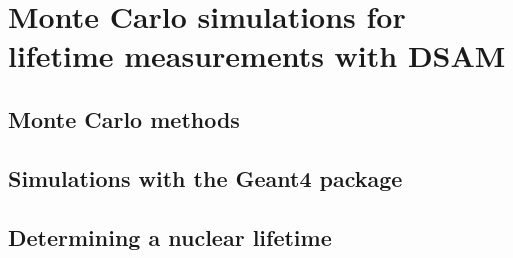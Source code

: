 %
%
%
%
%
%
%
%
%
%


%
%

\chapter{Monte Carlo simulations for lifetime measurements with DSAM}
\label{chap: simulation}

\section{Monte Carlo methods}
\label{sec: mc}

\section{Simulations with the Geant4 package}
\label{sec: geant}

\section{Determining a nuclear lifetime}
\label{sec: lifetime simulation}

%
% 
% 
